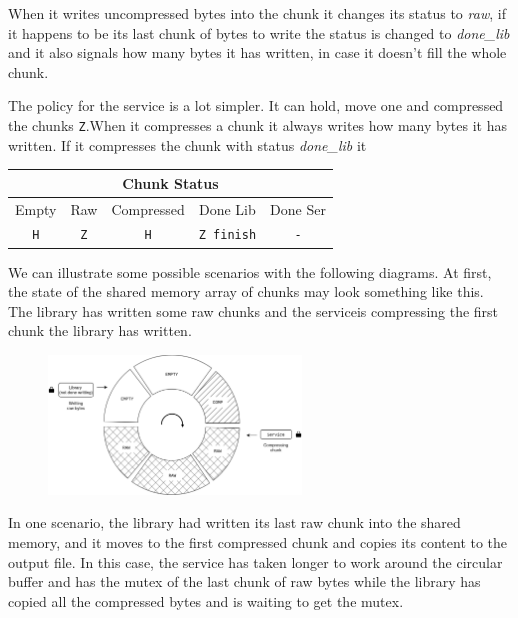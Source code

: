 \documentclass[12pt]{article}
\begin{document}
\par When it writes uncompressed bytes into the chunk it changes its status to \textit{raw}, if it happens to be its last chunk of bytes to write the status is changed to \textit{done\_lib} and it also signals how many bytes it has written, in case it doesn't fill the whole chunk.

\par The policy for the service is a lot simpler. It can hold, move one and compressed the chunks \texttt{Z}.When it compresses a chunk it always writes how many bytes it has written. If it compresses the chunk with status \textit{done\_lib} it 


\begin{table}[h]
\centering
\begin{tabular}{|c|c|c|c|c|}
\hline
\multicolumn{5}{|c|}{Chunk Status} \\ \hline
Empty & Raw & Compressed & Done Lib & Done Ser\\ \hline
\texttt{H} & \texttt{Z} & \texttt{H} & \texttt{Z finish} & \texttt{-} \\ \hline
\end{tabular}
\end{table}

\par We can illustrate some possible scenarios with the following diagrams. At first, the state of the shared memory array of chunks may look something like this. The library has written some raw chunks and the serviceis compressing the first chunk the library has written.

\begin{figure}[h]
\centering
\includegraphics[width=0.6\textwidth]{AOS-start.png}
\end{figure}
\FloatBarrier

\newpage
\par In one scenario, the library had written its last raw chunk into the shared memory, and it moves to the first compressed chunk and copies its content to the output file. In this case, the service has taken longer to work around the circular buffer and has the mutex of the last chunk of raw bytes while the library has copied all the compressed bytes and is waiting to get the mutex.
\end{document}
